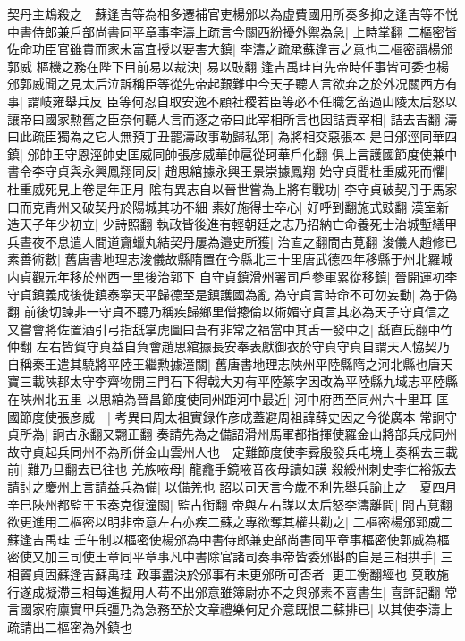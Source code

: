 契丹主鴆殺之　蘇逢吉等為相多遷補官吏楊邠以為虚費國用所奏多抑之逢吉等不悦中書侍郎兼戶部尚書同平章事李濤上疏言今關西紛擾外禦為急|{
	上時掌翻}
二樞密皆佐命功臣官雖貴而家未富宜授以要害大鎮|{
	李濤之疏承蘇逢吉之意也二樞密謂楊邠郭威}
樞機之務在陛下目前易以裁決|{
	易以䜴翻}
逢吉禹珪自先帝時任事皆可委也楊邠郭威聞之見太后泣訴稱臣等從先帝起艱難中今天子聽人言欲弃之於外况關西方有事|{
	謂岐雍舉兵反}
臣等何忍自取安逸不顧社稷若臣等必不任職乞留過山陵太后怒以讓帝曰國家勲舊之臣奈何聽人言而逐之帝曰此宰相所言也因詰責宰相|{
	詰去吉翻}
濤曰此疏臣獨為之它人無預丁丑罷濤政事勒歸私第|{
	為將相交惡張本}
是日邠涇同華四鎮|{
	邠帥王守恩涇帥史匡威同帥張彦威華帥扈從珂華戶化翻}
俱上言護國節度使兼中書令李守貞與永興鳳翔同反|{
	趙思綰據永興王景崇據鳳翔}
始守貞聞杜重威死而懼|{
	杜重威死見上卷是年正月}
隂有異志自以晉世嘗為上將有戰功|{
	李守貞破契丹于馬家口而克青州又破契丹於陽城其功不細}
素好施得士卒心|{
	好呼到翻施式豉翻}
漢室新造天子年少初立|{
	少詩照翻}
執政皆後進有輕朝廷之志乃招納亡命養死士治城塹繕甲兵晝夜不息遣人間道齎蠟丸結契丹屢為邉吏所獲|{
	治直之翻間古莧翻}
浚儀人趙修已素善術數|{
	舊唐書地理志浚儀故縣隋置在今縣北三十里唐武德四年移縣于州北羅城内貞觀元年移於州西一里後治郭下}
自守貞鎮滑州署司戶參軍累從移鎮|{
	晉開運初李守貞鎮義成後徙鎮泰寜天平歸德至是鎮護國為亂}
為守貞言時命不可勿妄動|{
	為于偽翻}
前後切諫非一守貞不聽乃稱疾歸鄉里僧摠倫以術媚守貞言其必為天子守貞信之又嘗會將佐置酒引弓指舐掌虎圖曰吾有非常之福當中其舌一發中之|{
	舐直氏翻中竹仲翻}
左右皆賀守貞益自負會趙思綰據長安奉表獻御衣於守貞守貞自謂天人恊契乃自稱秦王遣其驍將平陸王繼勲據潼關|{
	舊唐書地理志陜州平陸縣隋之河北縣也唐天寶三載陜郡太守李齊物開三門石下得戟大刃有平陸篆字因改為平陸縣九域志平陸縣在陜州北五里}
以思綰為晉昌節度使同州距河中最近|{
	河中府西至同州六十里耳}
匡國節度使張彦威　|{
	考異曰周太祖實録作彦成蓋避周祖諱薛史因之今從廣本}
常詗守貞所為|{
	詗古永翻又翾正翻}
奏請先為之備詔滑州馬軍都指揮使羅金山將部兵戍同州故守貞起兵同州不為所併金山雲州人也　定難節度使李彛殷發兵屯境上奏稱去三載前|{
	難乃旦翻去已往也}
羌族㖡母|{
	龍龕手鏡㖡音夜母讀如謨}
殺綏州刺史李仁裕叛去請討之慶州上言請益兵為備|{
	以備羌也}
詔以司天言今歲不利先舉兵諭止之　夏四月辛巳陜州都監王玉奏克復潼關|{
	監古衘翻}
帝與左右謀以太后怒李濤離間|{
	間古莧翻}
欲更進用二樞密以明非帝意左右亦疾二蘇之專欲奪其權共勸之|{
	二樞密楊邠郭威二蘇逢吉禹珪}
壬午制以樞密使楊邠為中書侍郎兼吏部尚書同平章事樞密使郭威為樞密使又加三司使王章同平章事凡中書除官諸司奏事帝皆委邠斟酌自是三相拱手|{
	三相竇貞固蘇逢吉蘇禹珪}
政事盡決於邠事有未更邠所可否者|{
	更工衡翻經也}
莫敢施行遂成凝滯三相每進擬用人苟不出邠意雖簿尉亦不之與邠素不喜書生|{
	喜許記翻}
常言國家府廪實甲兵彊乃為急務至於文章禮樂何足介意既恨二蘇排已|{
	以其使李濤上疏請出二樞密為外鎮也}
